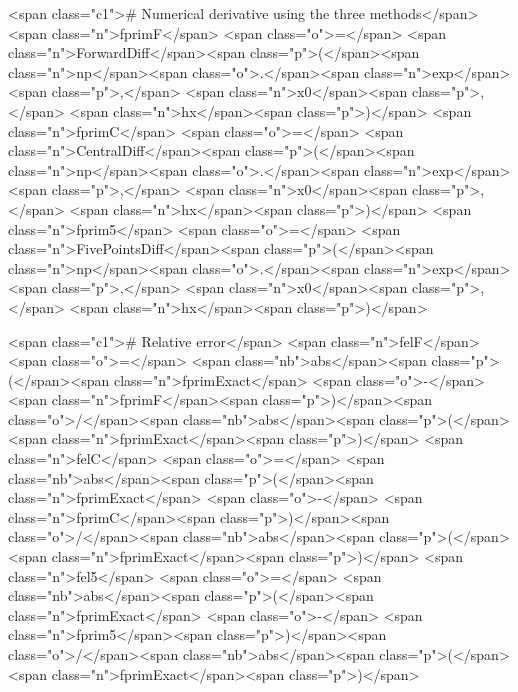 <span class="c1"># Numerical derivative using the three methods</span>
<span class="n">fprimF</span> <span class="o">=</span> <span class="n">ForwardDiff</span><span class="p">(</span><span class="n">np</span><span class="o">.</span><span class="n">exp</span><span class="p">,</span> <span class="n">x0</span><span class="p">,</span> <span class="n">hx</span><span class="p">)</span>
<span class="n">fprimC</span> <span class="o">=</span> <span class="n">CentralDiff</span><span class="p">(</span><span class="n">np</span><span class="o">.</span><span class="n">exp</span><span class="p">,</span> <span class="n">x0</span><span class="p">,</span> <span class="n">hx</span><span class="p">)</span>
<span class="n">fprim5</span> <span class="o">=</span> <span class="n">FivePointsDiff</span><span class="p">(</span><span class="n">np</span><span class="o">.</span><span class="n">exp</span><span class="p">,</span> <span class="n">x0</span><span class="p">,</span> <span class="n">hx</span><span class="p">)</span>

<span class="c1"># Relative error</span>
<span class="n">felF</span> <span class="o">=</span> <span class="nb">abs</span><span class="p">(</span><span class="n">fprimExact</span> <span class="o">-</span> <span class="n">fprimF</span><span class="p">)</span><span class="o">/</span><span class="nb">abs</span><span class="p">(</span><span class="n">fprimExact</span><span class="p">)</span>
<span class="n">felC</span> <span class="o">=</span> <span class="nb">abs</span><span class="p">(</span><span class="n">fprimExact</span> <span class="o">-</span> <span class="n">fprimC</span><span class="p">)</span><span class="o">/</span><span class="nb">abs</span><span class="p">(</span><span class="n">fprimExact</span><span class="p">)</span>
<span class="n">fel5</span> <span class="o">=</span> <span class="nb">abs</span><span class="p">(</span><span class="n">fprimExact</span> <span class="o">-</span> <span class="n">fprim5</span><span class="p">)</span><span class="o">/</span><span class="nb">abs</span><span class="p">(</span><span class="n">fprimExact</span><span class="p">)</span>

